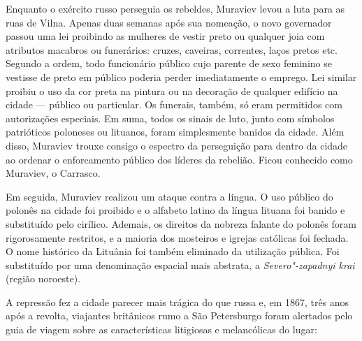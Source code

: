 Enquanto o exército russo perseguia os rebeldes, Muraviev levou a luta
para as ruas de Vilna. Apenas duas semanas após sua nomeação, o novo
governador passou uma lei proibindo as mulheres de vestir preto ou
qualquer joia com atributos macabros ou funerários: cruzes, caveiras,
correntes, laços pretos etc. Segundo a ordem, todo funcionário público
cujo parente de sexo feminino se vestisse de preto em público poderia
perder imediatamente o emprego. Lei similar proibiu o uso da cor preta
na pintura ou na decoração de qualquer edifício na cidade --- público ou
particular. Os funerais, também, só eram permitidos com autorizações
especiais. Em suma, todos os sinais de luto, junto com símbolos
patrióticos poloneses ou lituanos, foram simplesmente banidos da cidade.
Além disso, Muraviev trouxe consigo o espectro da perseguição para
dentro da cidade ao ordenar o enforcamento público dos líderes da
rebelião. Ficou conhecido como Muraviev, o Carrasco.

Em seguida, Muraviev realizou um ataque contra a língua. O uso público
do polonês na cidade foi proibido e o alfabeto latino da língua lituana
foi banido e substituído pelo cirílico. Ademais, os direitos da nobreza
falante do polonês foram rigorosamente restritos, e a maioria dos
mosteiros e igrejas católicas foi fechada. O nome histórico da Lituânia
foi também eliminado da utilização pública. Foi substituído por uma
denominação espacial mais abstrata, a \textit{Severo"-zapadnyi krai}
(região noroeste).

A repressão fez a cidade parecer mais trágica do que russa e, em 1867,
três anos após a revolta, viajantes britânicos rumo a São Petersburgo
foram alertados pelo guia de viagem sobre as características litigiosas
e melancólicas do lugar:

